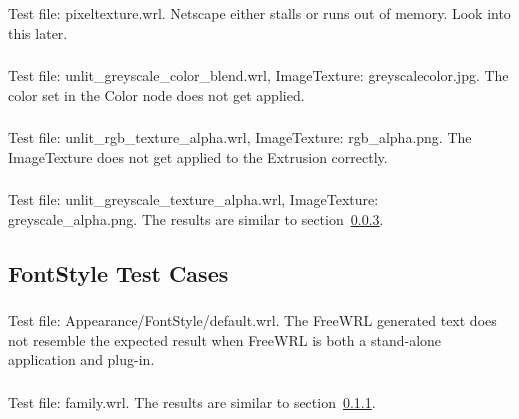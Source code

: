 \setcounter{subsubsection}{2}

\subsubsection{\AppC}
Test file: pixeltexture.wrl.\newline
Netscape either stalls or runs out of memory.
Look into this later.

\setcounter{subsubsection}{7}
\subsubsection{\AppH} 
Test file: unlit\_greyscale\_color\_blend.wrl, ImageTexture:
greyscalecolor.jpg.\newline
The color set in the Color node does not get applied.

\setcounter{subsubsection}{10}
\subsubsection{\AppKa\AppKb}
\label{sec:unlit-rgb-texture}
Test file: unlit\_rgb\_texture\_alpha.wrl, ImageTexture:
rgb\_alpha.png.\newline
The ImageTexture does not get applied to the Extrusion correctly.

\subsubsection{\AppL}
Test file: unlit\_greyscale\_texture\_alpha.wrl, ImageTexture:
greyscale\_alpha.png.\newline
The results are similar to section~\ref{sec:unlit-rgb-texture}.

\subsection{FontStyle Test Cases}

\subsubsection{\FSA}
\label{sec:fs-default}
Test file: Appearance/FontStyle/default.wrl.
The FreeWRL generated text does not resemble the expected result when
FreeWRL is both a stand-alone application and plug-in.

\subsubsection{\FSB}
\label{sec:3-families}
Test file: family.wrl.\newline
The results are similar to section~\ref{sec:fs-default}.

